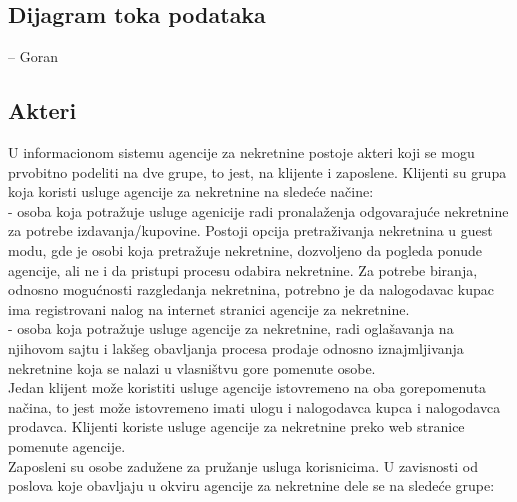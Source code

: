 \documentclass{article}
\begin{document}
\newpage
\subsection{\bfseries Dijagram toka podataka}
-- Goran

\newpage
\subsection{\bfseries Akteri}
\indent U informacionom sistemu agencije za nekretnine postoje akteri koji se mogu prvobitno podeliti na dve grupe, to jest, na klijente i zaposlene. Klijenti su grupa koja koristi usluge agencije za nekretnine na slede\' ce na\v {c}ine:\\

 - osoba koja potra\v {z}uje usluge agenicije radi pronala\v {z}enja odgovaraju\' ce nekretnine za potrebe izdavanja/kupovine. Postoji opcija pretra\v {z}ivanja nekretnina u guest modu, gde je osobi koja pretra\v {z}uje nekretnine, dozvoljeno da pogleda ponude agencije, ali ne i da pristupi procesu odabira nekretnine. Za potrebe biranja, odnosno mogu\' cnosti razgledanja nekretnina, potrebno je da nalogodavac kupac ima registrovani nalog na internet stranici agencije za nekretnine.\\
 - osoba koja potra\v {z}uje usluge agencije za nekretnine, radi ogla\v {s}avanja na njihovom sajtu i lak\v {s}eg obavljanja procesa prodaje odnosno iznajmljivanja nekretnine koja se nalazi u vlasni\v {s}tvu gore pomenute osobe.\\

Jedan klijent mo\v {z}e koristiti usluge agencije istovremeno na oba gorepomenuta na\v {c}ina, to jest mo\v {z}e istovremeno imati ulogu i nalogodavca kupca i nalogodavca prodavca. Klijenti koriste usluge agencije za nekretnine preko web stranice pomenute agencije.\\

\indent Zaposleni su osobe zadu\v {z}ene za pru\v {z}anje usluga korisnicima. U zavisnosti od poslova koje obavljaju u okviru agencije za nekretnine dele se na slede\' ce grupe:\\
\end{document}
